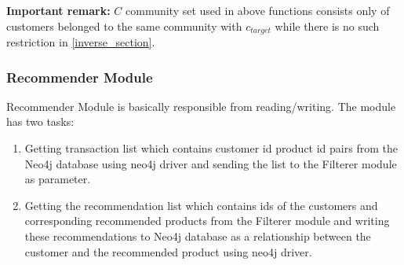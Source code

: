 	
	\textbf{Important remark:} $C$ community set used in above functions consists only of customers belonged to the same community with $c_{target}$ while there is no such restriction in \ref{inverse_section}.

	\subsubsection{Recommender Module} Recommender Module is basically responsible from reading/writing. The module has two tasks:
	\begin{enumerate}
		\item Getting transaction list which contains customer id product id pairs from the Neo4j database using neo4j driver and sending the list to the Filterer module as parameter.
		\item Getting the recommendation list which contains ids of the customers and corresponding recommended products from the Filterer module and writing these recommendations to Neo4j database as a relationship between the customer and the recommended product using neo4j driver.
	\end{enumerate}